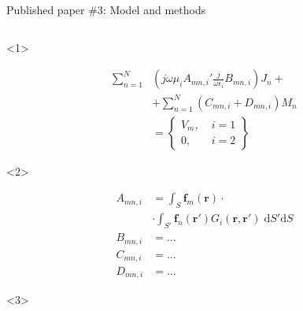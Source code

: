 \documentclass[xcolor=dvipsnames,10pt]{beamer}
\begin{document}
\begin{frame}{Published paper \#3: Model and methods}
        \begin{columns}[c]
        \begin{column}{0.4\textwidth}
            \begin{onlyenv}<1>
                \begin{footnotesize}
                    \begin{equation*}
                    \begin{aligned}
                        \sum_{n=1}^{N}{}& \left( j \omega \mu_i A_{mn,i} ' \frac{j}{\omega \epsilon_i} B_{mn,i} \right) J_n + \\
                        &+ \sum_{n=1}^{N} \left( C_{mn,i} + D_{mn,i} \right) M_n \\
                        &= \begin{Bmatrix} V_m, \; &i = 1 \\ 0, \; &i = 2 \end{Bmatrix}
                    \end{aligned}
                    \end{equation*}
                \end{footnotesize}
            \end{onlyenv}
            \begin{onlyenv}<2>
                \begin{footnotesize}
                    \begin{equation*}
                    \begin{aligned}
                        A_{mn,i} &= \int_S \mathbf{f}_m \left( \mathbf{r} \right) \cdot \\
                        & \cdot \int_{S'} \mathbf{f}_n \left( \mathbf{r}' \right) G_i(\mathbf{r}, \mathbf{r}') \; \mathrm{d}S' \mathrm{d}S \\
                        B_{mn,i} &= \dots \\
                        C_{mn,i} &= \dots \\
                        D_{mn,i} &= \dots
                    \end{aligned}    
                    \end{equation*}
                \end{footnotesize}
            \end{onlyenv}
            \begin{onlyenv}<3>
                \begin{figure}
                \centering

\end{figure}
\end{onlyenv}
\end{column}
\end{columns}
\end{frame}
\end{document}
